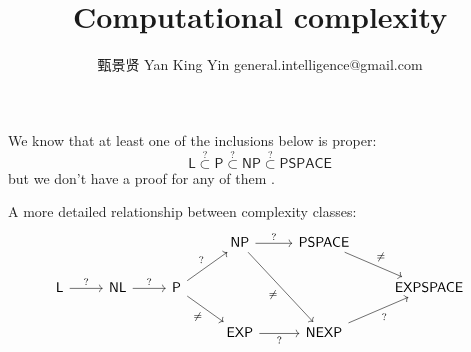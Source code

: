 

\title{Computational complexity}
\author{甄景贤 Yan King Yin {\footnotesize general.intelligence@gmail.com}}


	
\maketitle

We know that at least one of the inclusions below is proper:
\begin{equation}
\mathsf{L} \stackrel{?}{\subset} \mathsf{P} \stackrel{?}{\subset} \mathsf{NP} \stackrel{?}{\subset} \mathsf{PSPACE}
\end{equation}
but we don't have a proof for any of them \parencite{Moore2011}. %

A more detailed relationship between complexity classes:
\begin{equation}
\begin{tikzcd}[swap]
& & & \mathsf{NP} \arrow{r}[swap]{?} \arrow{ddr}{\neq} & \mathsf{PSPACE} \arrow{dr}[swap]{\neq} \\
\mathsf{L} \arrow{r}[swap]{?} & \mathsf{NL} \arrow{r}[swap]{?} & \mathsf{P} \arrow{ur}[swap]{?} \arrow{dr}{\neq} & & & \mathsf{EXPSPACE} \\
& & & \mathsf{EXP} \arrow{r}{?} & \mathsf{NEXP} \arrow{ur}{?} 
\end{tikzcd}
\end{equation}

